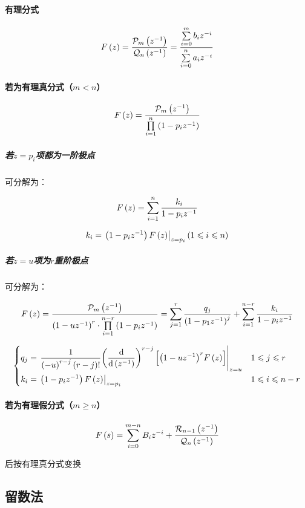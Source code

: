 \documentclass{article}
\begin{document}
\paragraph{有理分式}

\[F\left(z\right)=\frac{\mathcal P_m\left(z^{-1}\right)}{\mathcal Q_n\left(z^{-1}\right)}
    =\frac{\sum\limits_{i=0}^mb_iz^{-i}}{\sum\limits_{i=0}^na_iz^{-i}}\]

\paragraph{若为有理真分式（$m<n$）}

\[F\left(z\right)=\frac{\mathcal P_m\left(z^{-1}\right)}{\prod\limits_{i=1}^n\left(1-p_iz^{-1}\right)}\]

\subparagraph{若$z=p_i$项都为一阶极点}

可分解为：

\[F\left(z\right)=\sum_{i=1}^n\frac{k_i}{1-p_iz^{-1}}\]

\[k_i=\left.\left(1-p_iz^{-1}\right)F\left(z\right)\right|_{z=p_i}\left(1\leqslant i\leqslant n\right)\]

\subparagraph{若$z=u$项为$r$重阶极点}

可分解为：

\[F\left(z\right)=\frac{\mathcal P_m\left(z^{-1}\right)}{{\left(1-uz^{-1}\right)}^r\cdot\prod\limits_{i=1}^{n-r}\left(1-p_iz^{-1}\right)}
    =\sum_{j=1}^r\frac{q_j}{{\left(1-p_1z^{-1}\right)}^j}+\sum_{i=1}^{n-r}\frac{k_i}{1-p_iz^{-1}}\]

\[\left\{\begin{aligned}
        q_j & =\left.\frac1{{\left(-u\right)^{r-j}}\left(r-j\right)!}{\left(\frac{\mathrm d}{\mathrm d\left(z^{-1}\right)}\right)}^{r-j}\left[{\left(1-uz^{-1}\right)}^rF\left(z\right)\right]\right|_{z=u} &  & 1\leqslant j\leqslant r   \\
        k_i & =\left.\left(1-p_iz^{-1}\right)F\left(z\right)\right|_{z=p_i}                                                                                         &  & 1\leqslant i\leqslant n-r
    \end{aligned}\right.\]

\paragraph{若为有理假分式（$m\geqslant n$）}

\[F\left(s\right)=\sum_{i=0}^{m-n}B_iz^{-i}+\frac{\mathcal R_{n-1}\left(z^{-1}\right)}{\mathcal Q_n\left(z^{-1}\right)}\]

后按有理真分式变换

\subsection{留数法}
\end{document}

